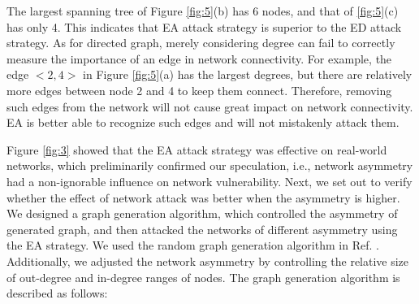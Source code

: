 \documentclass[aps,prl,twocolumn,showpacs,superscriptaddress,groupedaddress]{revtex4}  %
\begin{document}
The largest spanning tree of Figure \ref{fig:5}(b) has 6 nodes, and that of \ref{fig:5}(c) has only 4. This indicates that EA attack strategy is superior to the ED attack strategy. As for directed graph, merely considering degree can fail to correctly measure the importance of an edge in network connectivity. For example, the edge $<2, 4>$ in Figure \ref{fig:5}(a) has the largest degrees, but there are relatively more edges between node 2 and 4 to keep them connect. Therefore, removing such edges from the network will not cause great impact on network connectivity. EA is better able to recognize such edges and will not mistakenly attack them.


Figure \ref{fig:3} showed that the EA attack strategy was effective on real-world networks, which preliminarily confirmed our speculation, i.e., network asymmetry had a non-ignorable influence on network vulnerability. Next, we set out to verify whether the effect of network attack was better when the asymmetry is higher. We designed a graph generation algorithm, which controlled the asymmetry of generated graph, and then attacked the networks of different asymmetry using the EA strategy. We used the random graph generation algorithm in Ref. \cite{Newman2001Random}. Additionally, we adjusted the network asymmetry by controlling the relative size of out-degree and in-degree ranges of nodes. The graph generation algorithm is described as follows:
\end{document}
